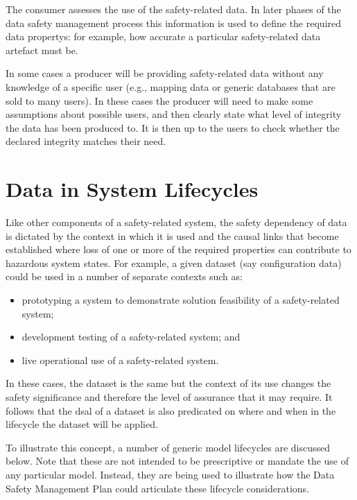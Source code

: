 The consumer assesses the use of the safety-related data. In later phases of the data safety management process this \gls{information} is used to define the required \glspl{data property}: for example, how accurate a particular safety-related \gls{data artefact} must be.

In some cases a producer will be providing safety-related data without any knowledge of a specific user (e.g., mapping data or generic \glspl{database} that are sold to many users). In these cases the producer will need to make some assumptions about possible users, and then clearly state what level of \gls{integrity} the data has been produced to. It is then up to the users to check whether the declared \gls{integrity} matches their need.



\section{Data in System Lifecycles}
Like other components of a safety-related system, the safety dependency of data is dictated by the context in which it is used and the causal links that become established where loss of one or more of the required properties can contribute to hazardous system states. For example, a given \gls{dataset} (say \gls{configuration data}) could be used in a number of separate contexts such as:
\begin{itemize}
  \item prototyping a system to demonstrate solution feasibility of a safety-related system;
  \item development testing of a safety-related system; and
  \item live operational use of a safety-related system.
\end{itemize}

In these cases, the \gls{dataset} is the same but the context of its use changes the safety significance and therefore the level of assurance that it may require. It follows that the \gls{dsal} of a \gls{dataset} is also predicated on where and when in the lifecycle the \gls{dataset} will be applied. 

To illustrate this concept, a number of generic model lifecycles are discussed below. Note that these are not intended to be prescriptive or mandate the use of any particular model. Instead, they are being used to illustrate how the Data Safety Management Plan could articulate these lifecycle considerations.

